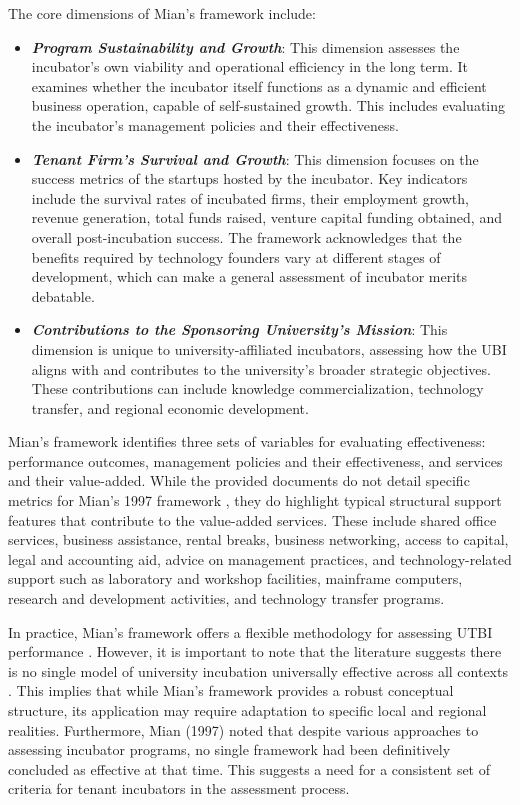 \documentclass[../Main.tex]{subfiles}
\begin{document}
The core dimensions of Mian's framework include:
\begin{itemize}
    \item \emph{\textbf{Program Sustainability and Growth}}: This dimension assesses the incubator's own viability and operational efficiency in the long term. It examines whether the incubator itself functions as a dynamic and efficient business operation, capable of self-sustained growth. This includes evaluating the incubator's management policies and their effectiveness.
    \item \emph{\textbf{Tenant Firm's Survival and Growth}}: This dimension focuses on the success metrics of the startups hosted by the incubator. Key indicators include the survival rates of incubated firms, their employment growth, revenue generation, total funds raised, venture capital funding obtained, and overall post-incubation success. The framework acknowledges that the benefits required by technology founders vary at different stages of development, which can make a general assessment of incubator merits debatable.
    \item \emph{\textbf{Contributions to the Sponsoring University's Mission}}: This dimension is unique to university-affiliated incubators, assessing how the UBI aligns with and contributes to the university's broader strategic objectives. These contributions can include knowledge commercialization, technology transfer, and regional economic development.
\end{itemize}

Mian's framework identifies three sets of variables for evaluating effectiveness: performance outcomes, management policies and their effectiveness, and services and their value-added. While the provided documents do not detail specific metrics for Mian's 1997 framework , they do highlight typical structural support features that contribute to the value-added services. These include shared office services, business assistance, rental breaks, business networking, access to capital, legal and accounting aid, advice on management practices, and technology-related support such as laboratory and workshop facilities, mainframe computers, research and development activities, and technology transfer programs.

In practice, Mian's framework offers a flexible methodology for assessing UTBI performance \cite{Chan2005Assessing}. However, it is important to note that the literature suggests there is no single model of university incubation universally effective across all contexts \cite{Yovera2025Academic}. This implies that while Mian's framework provides a robust conceptual structure, its application may require adaptation to specific local and regional realities. Furthermore, Mian (1997) noted that despite various approaches to assessing incubator programs, no single framework had been definitively concluded as effective at that time. This suggests a need for a consistent set of criteria for tenant incubators in the assessment process.
\end{document}
